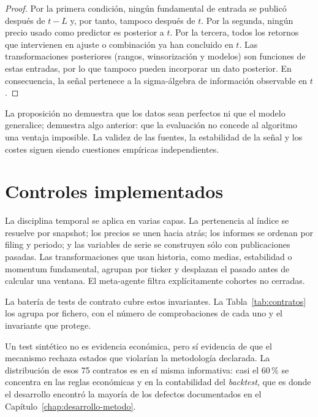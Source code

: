 \begin{proof}
Por la primera condición, ningún fundamental de entrada se publicó después
de $t-L$ y, por tanto, tampoco después de $t$. Por la segunda, ningún precio usado como predictor
es posterior a $t$. Por la tercera, todos los retornos que intervienen en ajuste o combinación ya
han concluido en $t$. Las transformaciones posteriores (rangos, winsorización y modelos) son
funciones de estas entradas, por lo que tampoco pueden incorporar un dato posterior. En
consecuencia, la señal pertenece a la sigma-álgebra de información observable en $t$.
\end{proof}

La proposición no demuestra que los datos sean perfectos ni que el modelo generalice; demuestra algo
anterior: que la evaluación no concede al algoritmo una ventaja imposible. La validez de las fuentes,
la estabilidad de la señal y los costes siguen siendo cuestiones empíricas independientes.

\section{Controles implementados}

La disciplina temporal se aplica en varias capas. La pertenencia al índice se resuelve por snapshot;
los precios se unen hacia atrás; los informes se ordenan por filing y periodo; y las variables de
serie se construyen sólo con publicaciones pasadas. Las transformaciones que usan historia, como
medias, estabilidad o momentum fundamental, agrupan por ticker y desplazan el pasado antes de
calcular una ventana. El meta-agente filtra explícitamente cohortes no cerradas.

La batería de tests de contrato cubre estos invariantes. La Tabla~\ref{tab:contratos} los agrupa por
fichero, con el número de comprobaciones de cada uno y el invariante que protege.

\begin{table}[H]
  \centering
  \footnotesize
  \caption{Batería de contratos que protege los invariantes metodológicos.}
  \label{tab:contratos}
  
  \caption*{Fuente: recuento de funciones \texttt{test\_*} en  del repositorio.}
\end{table}

Un test sintético no es evidencia económica, pero sí evidencia de que el mecanismo rechaza estados
que violarían la metodología declarada. La distribución de esos 75 contratos es en sí misma
informativa: casi el 60\,\% se concentra en las reglas económicas y en la contabilidad del
\textit{backtest}, que es donde el desarrollo encontró la mayoría de los defectos documentados en el
Capítulo~\ref{chap:desarrollo-metodo}.

